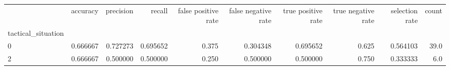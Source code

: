 \begin{tabular}{lrrrrrrrrr}
\toprule
{} &  accuracy &  precision &    recall &  false positive rate &  false negative rate &  true positive rate &  true negative rate &  selection rate &  count \\
tactical\_situation &           &            &           &                      &                      &                     &                     &                 &        \\
\midrule
0                  &  0.666667 &   0.727273 &  0.695652 &                0.375 &             0.304348 &            0.695652 &               0.625 &        0.564103 &   39.0 \\
2                  &  0.666667 &   0.500000 &  0.500000 &                0.250 &             0.500000 &            0.500000 &               0.750 &        0.333333 &    6.0 \\
\bottomrule
\end{tabular}

